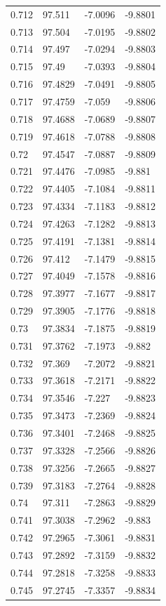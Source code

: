 \begin{tabular}{llll}
0.712 & 97.511 & -7.0096 & -9.8801 \\
0.713 & 97.504 & -7.0195 & -9.8802 \\
0.714 & 97.497 & -7.0294 & -9.8803 \\
0.715 & 97.49 & -7.0393 & -9.8804 \\
0.716 & 97.4829 & -7.0491 & -9.8805 \\
0.717 & 97.4759 & -7.059 & -9.8806 \\
0.718 & 97.4688 & -7.0689 & -9.8807 \\
0.719 & 97.4618 & -7.0788 & -9.8808 \\
0.72 & 97.4547 & -7.0887 & -9.8809 \\
0.721 & 97.4476 & -7.0985 & -9.881 \\
0.722 & 97.4405 & -7.1084 & -9.8811 \\
0.723 & 97.4334 & -7.1183 & -9.8812 \\
0.724 & 97.4263 & -7.1282 & -9.8813 \\
0.725 & 97.4191 & -7.1381 & -9.8814 \\
0.726 & 97.412 & -7.1479 & -9.8815 \\
0.727 & 97.4049 & -7.1578 & -9.8816 \\
0.728 & 97.3977 & -7.1677 & -9.8817 \\
0.729 & 97.3905 & -7.1776 & -9.8818 \\
0.73 & 97.3834 & -7.1875 & -9.8819 \\
0.731 & 97.3762 & -7.1973 & -9.882 \\
0.732 & 97.369 & -7.2072 & -9.8821 \\
0.733 & 97.3618 & -7.2171 & -9.8822 \\
0.734 & 97.3546 & -7.227 & -9.8823 \\
0.735 & 97.3473 & -7.2369 & -9.8824 \\
0.736 & 97.3401 & -7.2468 & -9.8825 \\
0.737 & 97.3328 & -7.2566 & -9.8826 \\
0.738 & 97.3256 & -7.2665 & -9.8827 \\
0.739 & 97.3183 & -7.2764 & -9.8828 \\
0.74 & 97.311 & -7.2863 & -9.8829 \\
0.741 & 97.3038 & -7.2962 & -9.883 \\
0.742 & 97.2965 & -7.3061 & -9.8831 \\
0.743 & 97.2892 & -7.3159 & -9.8832 \\
0.744 & 97.2818 & -7.3258 & -9.8833 \\
0.745 & 97.2745 & -7.3357 & -9.8834 \\

\end{tabular}
